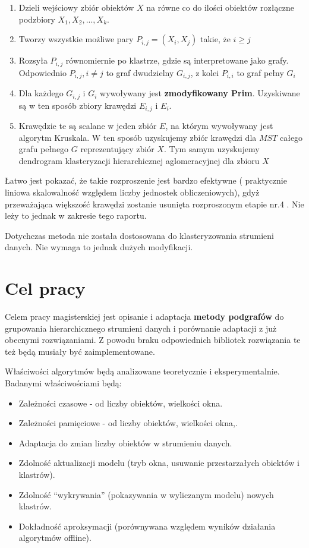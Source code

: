 \documentclass[11pt]{mgr}
\begin{document}
\begin{enumerate}
\item
  Dzieli wejściowy zbiór obiektów \(X\) na równe co do ilości obiektów
  rozłączne podzbiory \(X_{1}, X_{2},...,X_{k}\).
\item
  Tworzy wszystkie możliwe pary \(P_{i,j} = (X_{i},X_{j})\) takie, że \( i \geq j \)
\item
  Rozsyła \(P_{i,j}\) równomiernie po klastrze, gdzie są interpretowane
  jako grafy. Odpowiednio \(P_{i,j}, i \ne j\) to graf dwudzielny
  \(G_{i,j}\), z kolei \(P_{i,i}\) to graf pełny \(G_{i}\)
\item
  Dla każdego \(G_{i,j}\) i \(G_{i}\) wywoływany jest
  \textbf{zmodyfikowany Prim}. Uzyskiwane są w ten sposób zbiory
  krawędzi \(E_{i,j}\) i \(E_{i}\).
\item
  Krawędzie te są scalane w jeden zbiór \(E\), na którym wywoływany jest
  algorytm Kruskala. W ten sposób uzyskujemy zbiór krawędzi dla \(MST\)
  całego grafu pełnego \(G\) reprezentujący zbiór \(X\). Tym samym
  uzyskujemy dendrogram klasteryzacji hierarchicznej aglomeracyjnej dla
  zbioru \(X\)
\end{enumerate}

Łatwo jest pokazać, że takie rozproszenie jest bardzo efektywne (
praktycznie liniowa skalowalność względem liczby jednostek
obliczeniowych), gdyż przeważająca większość krawędzi zostanie usunięta
rozproszonym etapie nr.4 . Nie leży to jednak w zakresie tego raportu.

Dotychczas metoda nie została dostosowana do klasteryzowania strumieni
danych. Nie wymaga to jednak dużych modyfikacji.

\chapter{Cel pracy}\label{cel-pracy}

Celem pracy magisterskiej jest opisanie i adaptacja \textbf{metody podgrafów} do grupowania hierarchicznego strumieni danych i porównanie adaptacji z już obecnymi rozwiązaniami. Z powodu braku odpowiednich bibliotek rozwiązania te też będą musiały być zaimplementowane.

Właściwości algorytmów będą analizowane teoretycznie i eksperymentalnie. Badanymi właściwościami będą:

\begin{itemize}
\item
  Zależności czasowe - od liczby obiektów, wielkości okna.
\item
  Zależności pamięciowe - od liczby obiektów, wielkości okna,.
\item
  Adaptacja do zmian liczby obiektów w strumieniu danych.
\item
  Zdolność aktualizacji modelu (tryb okna, usuwanie przestarzałych
  obiektów i klastrów).
\item
  Zdolność ``wykrywania'' (pokazywania w wyliczanym modelu) nowych
  klastrów.
\item
  Dokładność aproksymacji (porównywana względem wyników działania
  algorytmów offline).
\end{itemize}
\end{document}
